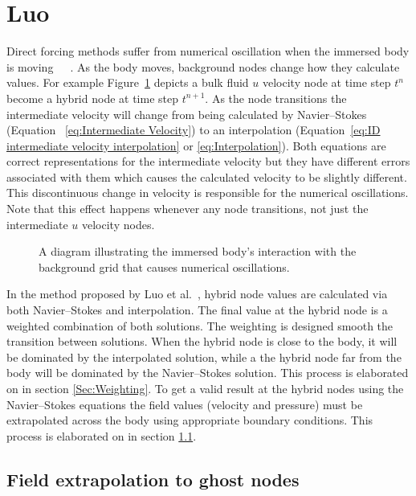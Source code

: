 \section{Luo}

Direct forcing methods suffer from numerical oscillation when the immersed body is moving~\cite{Sotiropoulos:2014gv}~\cite{Mittal:2005ii}~\cite{liao2010simulating}.
As the body moves, background nodes change how they calculate values. 
For example Figure~\ref{fig:Temporal Discontinuity} depicts a bulk fluid $u$ velocity node at time step $t^n$ become a hybrid node at time step $t^{n+1}$.
As the node transitions the intermediate velocity will change from being calculated by Navier--Stokes (Equation ~\eqref{eq:Intermediate Velocity}) to an interpolation (Equation~\eqref{eq:ID intermediate velocity interpolation} or \eqref{eq:Interpolation}). 
Both equations are correct representations for the intermediate velocity but they have different errors associated with them which causes the calculated velocity to be slightly different. 
This discontinuous change in velocity is responsible for the numerical oscillations. 
Note that this effect happens whenever any node transitions, not just the intermediate $u$ velocity nodes.

\begin{figure}[!htb]
    \centering
    
    \caption{A diagram illustrating the immersed body's interaction with the background grid that causes numerical oscillations.}
    \label{fig:Temporal Discontinuity}
\end{figure}

In the method proposed by Luo et al.~\cite{Luo:2012gx}, hybrid node values are calculated via both Navier--Stokes and interpolation.
The final value at the hybrid node is a weighted combination of both solutions. 
The weighting is designed smooth the transition between solutions. 
When the hybrid node is close to the body, it will be dominated by the interpolated solution, while a the hybrid node far from the body will be dominated by the Navier--Stokes solution. 
This process is elaborated on in section \ref{Sec:Weighting}. 
To get a valid result at the hybrid nodes using the Navier--Stokes equations the field values (velocity and pressure) must be extrapolated across the body using appropriate boundary conditions. 
This process is elaborated on in section \ref{Sec:Field Extrapolation}. 


\subsection{Field extrapolation to ghost nodes}
\label{Sec:Field Extrapolation}

